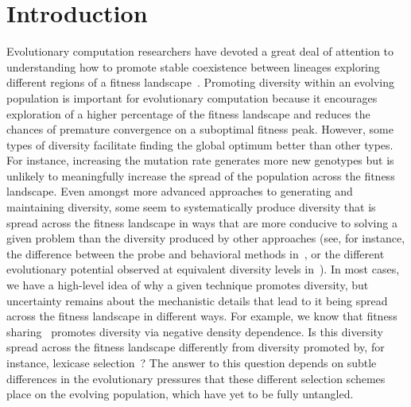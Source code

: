 \section{Introduction}

Evolutionary computation researchers have devoted a great deal of attention to understanding how to promote stable coexistence between lineages exploring different regions of a fitness landscape~\cite{goldberg_genetic_1987,mahfoud_niching_1995, mouret_using_2009,pugh_confronting_2015}. Promoting diversity within an evolving population is important for evolutionary computation because it encourages exploration of a higher percentage of the fitness landscape and reduces the chances of premature convergence on a suboptimal fitness peak. However, some types of diversity facilitate finding the global optimum better than other types. For instance, increasing the mutation rate generates more new genotypes but is unlikely to meaningfully increase the spread of the population across the fitness landscape. Even amongst more advanced approaches to generating and maintaining diversity, some seem to systematically produce diversity that is spread across the fitness landscape in ways that are more conducive to solving a given problem than the diversity produced by other approaches (see, for instance, the difference between the probe and behavioral methods in~\cite{mouret_using_2009}, or the different evolutionary potential observed at equivalent diversity levels in~\cite{walker_evolutionary_2012}). In most cases, we have a high-level idea of why a given technique promotes diversity, but uncertainty remains about the mechanistic details that lead to it being spread across the fitness landscape in different ways. For example, we know that fitness sharing~\cite{goldberg_genetic_1987} promotes diversity via negative density dependence. Is this diversity spread across the fitness landscape differently from diversity promoted by, for instance, lexicase selection~\cite{spector_assessment_2012}? The answer to this question depends on subtle differences in the evolutionary pressures that these different selection schemes place on the evolving population, which have yet to be fully untangled.

